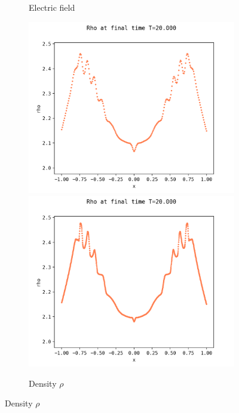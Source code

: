 \documentclass{article}
\numberwithin{equation}{section}
\newcommand{\mysubcaption}[1]{
	\vspace*{5pt}
	\begin{minipage}{0.8\linewidth}
		\begin{center}
			\footnotesize\emph{#1}
		\end{center}
	\end{minipage}
}
\newcommand{\imh}{\textheight} %
\newcommand{\imw}{\textwidth} %
\begin{document}
\begin{figure}
\begin{subfigure}{\textwidth}
		\caption{Electric field}
	\end{subfigure}
	\begin{subfigure}{\textwidth}
		\centering
		\includegraphics[height=\imh,width=\imw]{images/rho_run5ab.png}
		\includegraphics[height=\imh,width=\imw]{images/rho_run5ac.png}
		\caption{Density $\rho$}
	\end{subfigure}
	

\end{figure}
\end{document}
